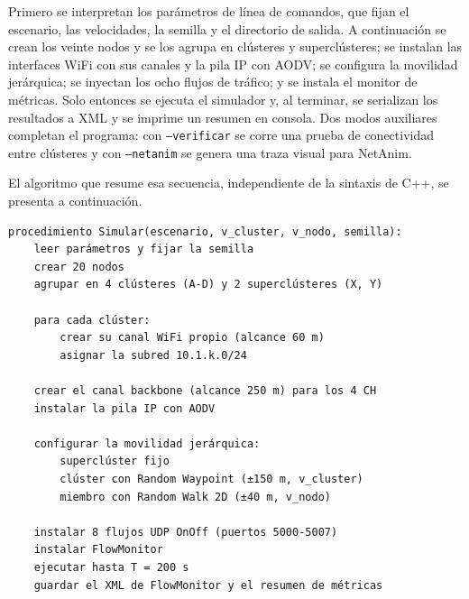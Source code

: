 Primero se interpretan los parámetros de línea de comandos, que fijan el escenario, las
velocidades, la semilla y el directorio de salida. A continuación se crean los veinte
nodos y se los agrupa en clústeres y superclústeres; se instalan las interfaces WiFi con
sus canales y la pila IP con AODV; se configura la movilidad jerárquica; se inyectan los
ocho flujos de tráfico; y se instala el monitor de métricas. Solo entonces se ejecuta el
simulador y, al terminar, se serializan los resultados a XML y se imprime un resumen en
consola. Dos modos auxiliares completan el programa: con \texttt{--verificar} se corre
una prueba de conectividad entre clústeres y con \texttt{--netanim} se genera una traza
visual para NetAnim.

\newpage
El algoritmo que resume esa secuencia, independiente de la sintaxis de C++, se presenta
a continuación.

\begin{verbatim}
procedimiento Simular(escenario, v_cluster, v_nodo, semilla):
    leer parámetros y fijar la semilla
    crear 20 nodos
    agrupar en 4 clústeres (A-D) y 2 superclústeres (X, Y)

    para cada clúster:
        crear su canal WiFi propio (alcance 60 m)
        asignar la subred 10.1.k.0/24

    crear el canal backbone (alcance 250 m) para los 4 CH
    instalar la pila IP con AODV

    configurar la movilidad jerárquica:
        superclúster fijo
        clúster con Random Waypoint (±150 m, v_cluster)
        miembro con Random Walk 2D (±40 m, v_nodo)

    instalar 8 flujos UDP OnOff (puertos 5000-5007)
    instalar FlowMonitor
    ejecutar hasta T = 200 s
    guardar el XML de FlowMonitor y el resumen de métricas
\end{verbatim}
